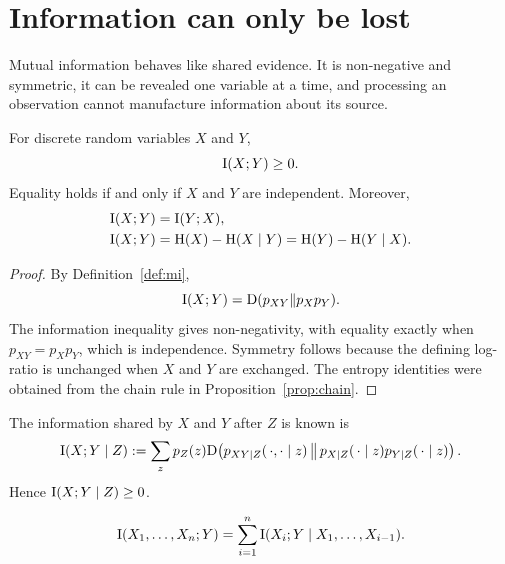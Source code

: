 \section{Information can only be lost}\label{sec:information-properties}
\quad{}

\begin{strand}
Mutual information behaves like shared evidence. It is non-negative and
symmetric, it can be revealed one variable at a time, and processing an
observation cannot manufacture information about its source.
\end{strand}

\begin{proposition}\label{prop:mi-properties}
For discrete random variables $X$ and $Y$,
\[
  \mathrm{I}(X;Y)\ge0.
\]
Equality holds if and only if $X$ and $Y$ are independent. Moreover,
\begin{align*}
  \mathrm{I}(X;Y)&=\mathrm{I}(Y;X),\\
  \mathrm{I}(X;Y)&=\mathrm{H}(X)-\mathrm{H}(X\mid Y)
           =\mathrm{H}(Y)-\mathrm{H}(Y\mid X).
\end{align*}
\end{proposition}

\begin{proof}
By Definition~\ref{def:mi},
\[
  \mathrm{I}(X;Y)=\mathrm{D}(p_{XY}\Vert p_Xp_Y).
\]
The information inequality gives
non-negativity, with equality exactly when $p_{XY}=p_Xp_Y$, which is
independence. Symmetry follows because the defining log-ratio is unchanged
when $X$ and $Y$ are exchanged. The entropy identities were obtained from the
chain rule in Proposition~\ref{prop:chain}.
\end{proof}

\begin{definition}\label{def:conditional-mi}
The information shared by $X$ and $Y$ after $Z$ is known is
\[
  \mathrm{I}(X;Y\mid Z)
  :=\sum_zp_Z(z)\mathrm{D}\!\left(
    p_{XY\mid Z}(\,\cdot,\cdot\mid z)
    \,\middle\Vert\,
    p_{X\mid Z}(\,\cdot\mid z)p_{Y\mid Z}(\,\cdot\mid z)\right).
\]
Hence $\mathrm{I}(X;Y\mid Z)\ge0$.
\end{definition}

\begin{proposition}\label{prop:mi-chain}
\[
  \mathrm{I}(X_1,\ldots,X_n;Y)
  =\sum_{i=1}^n
    \mathrm{I}(X_i;Y\mid X_1,\ldots,X_{i-1}).
\]
\end{proposition}

